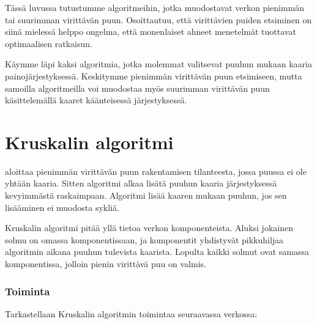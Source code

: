 Tässä luvussa tutustumme algoritmeihin,
jotka muodostavat verkon pienimmän tai suurimman
virittävän puun.
Osoittautuu, että virittävien puiden etsiminen
on siinä mielessä helppo ongelma,
että monenlaiset ahneet menetelmät tuottavat
optimaalisen ratkaisun.

Käymme läpi kaksi algoritmia, jotka molemmat valitsevat
puuhun mukaan kaaria painojärjestyksessä.
Keskitymme pienimmän virittävän puun etsimiseen,
mutta samoilla algoritmeilla voi muodostaa myös suurimman virittävän
puun käsittelemällä kaaret käänteisessä järjestyksessä.

\section{Kruskalin algoritmi}


 aloittaa pienimmän
virittävän
puun rakentamisen tilanteesta,
jossa puussa ei ole yhtään kaaria.
Sitten algoritmi alkaa lisätä
puuhun kaaria järjestyksessä
kevyimmästä raskaimpaan.
Algoritmi lisää kaaren mukaan puuhun,
jos sen lisääminen ei muodosta sykliä.

Kruskalin algoritmi pitää yllä
tietoa verkon komponenteista.
Aluksi jokainen solmu on omassa
komponentissaan,
ja komponentit yhdistyvät pikkuhiljaa
algoritmin aikana puuhun tulevista kaarista.
Lopulta kaikki solmut ovat samassa
komponentissa, jolloin pienin virittävä puu on valmis.

\subsubsection{Toiminta}

\begin{samepage}
Tarkastellaan Kruskalin algoritmin toimintaa
seuraavassa verkossa:
\begin{center}
\end{center}
\end{samepage}

